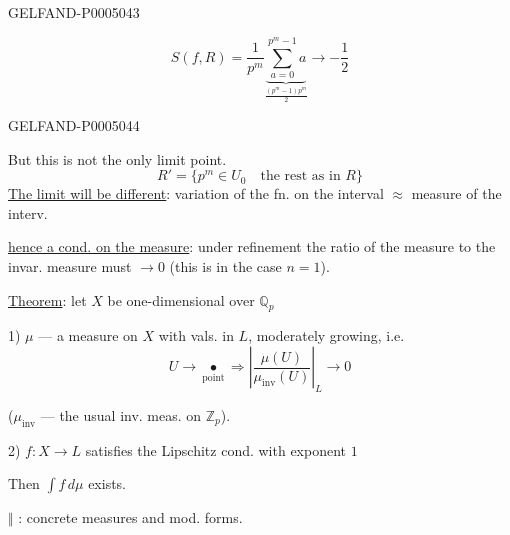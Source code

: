 \begin{GelfandAdjacentEvidence}{GELFAND-P000504}{3}

\[
S(f,R)=\frac1{p^m}\underbrace{\sum_{a=0}^{p^m-1}a}_{\displaystyle\frac{(p^m-1)p^m}{2}}
\longrightarrow-\frac12
\]
\end{GelfandAdjacentEvidence}
\begin{GelfandAdjacentEvidence}{GELFAND-P000504}{4}


But this is not the only limit point.
\[
R'=\{p^m\in U_0\quad\text{the rest as in }R\}
\]
\uline{The limit will be different}: variation of the fn. on the interval $\approx$ measure of the interv.

\uline{hence a cond. on the measure}: under refinement the ratio of the measure to the invar. measure must $\longrightarrow0$ (this is in the case $n=1$).

\uline{Theorem}: let $X$ be one-dimensional over $\mathbb Q_p$

1) $\mu$ — a measure on $X$ with vals. in $L$, moderately growing,
i.e.
\[
U\longrightarrow\underset{\text{point}}{\bullet}
\Longrightarrow
\left|\frac{\mu(U)}{\mu_{\mathrm{inv}}(U)}\right|_L\longrightarrow0
\]
\end{GelfandAdjacentEvidence}

($\mu_{\mathrm{inv}}$ — the usual inv. meas. on $\mathbb Z_p$).

2) $f:X\longrightarrow L$ satisfies the Lipschitz cond. with exponent $1$

Then $\int f\,d\mu$ exists.

\begin{flushright}
$\Vert$ : concrete measures and mod. forms.
\end{flushright}


